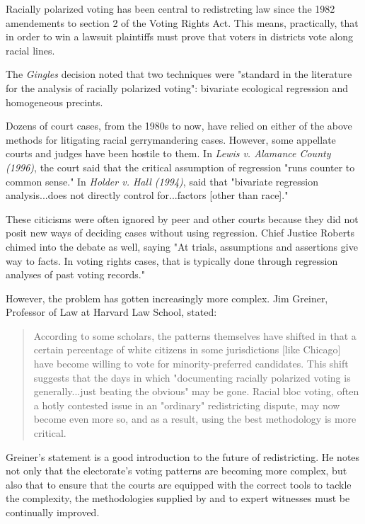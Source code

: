 \documentclass[fleqn,10pt]{style}
\begin{document}
Racially polarized voting has been central to redistrcting law since the 1982 amendements to section 2 of the Voting Rights Act.\cite{greiner} This means, practically, that in order to win a lawsuit plaintiffs must prove that voters in districts vote along racial lines.

The \textit{Gingles} decision noted that two techniques were "standard in the literature for the analysis of racially polarized voting"\cite{thornburg}: bivariate ecological regression and homogeneous precints.

Dozens of court cases, from the 1980s to now, have relied on either of the above methods for litigating racial gerrymandering cases\cite{greiner}. However, some appellate courts and judges have been hostile to them. In \textit{Lewis v. Alamance County (1996)}\cite{Lewis_Alamance}, the court said that the critical assumption of regression "runs counter to common sense." In \textit{Holder v. Hall (1994)}\cite{Holder_Hall}, said that "bivariate regression analysis...does not directly control for...factors [other than race]."

These citicisms were often ignored by peer and other courts because they did not posit new ways of deciding cases without using regression. Chief Justice Roberts chimed into the debate as well, saying "At trials, assumptions and assertions give way to facts. In voting rights cases, that is typically done through regression analyses of past voting records."\cite{LULAC}

However, the problem has gotten increasingly more complex. Jim Greiner, Professor of Law at Harvard Law School, stated:

\begin{quote}
 According to some scholars, the patterns themselves have shifted in that a certain percentage of white citizens in some jurisdictions [like Chicago] have become willing to vote for minority-preferred candidates. This shift suggests that the days in which "documenting racially polarized voting is generally...just beating the obvious" may be gone. Racial bloc voting, often a hotly contested issue in an "ordinary" redistricting dispute, may now become even more so, and as a result, using the best methodology is more critical.\cite{greiner}
\end{quote}

Greiner's statement is a good introduction to the future of redistricting. He notes not only that the electorate's voting patterns are becoming more complex, but also that to ensure that the courts are equipped with the correct tools to tackle the complexity, the methodologies supplied by and to expert witnesses must be continually improved.
\end{document}

